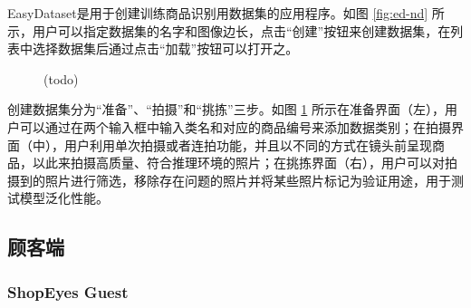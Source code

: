 EasyDataset是用于创建训练商品识别用数据集的应用程序。如图 \ref{fig:ed-nd} 所示，用户可以指定数据集的名字和图像边长，点击“创建”按钮来创建数据集，在列表中选择数据集后通过点击“加载”按钮可以打开之。

\begin{figure}[htbp]
    \centering
    \hfill
    \hfill
	\caption{(todo)}
	\label{fig:ed-edit}
\end{figure}

创建数据集分为“准备”、“拍摄”和“挑拣”三步。如图 \ref{fig:ed-edit} 所示在准备界面（左），用户可以通过在两个输入框中输入类名和对应的商品编号来添加数据类别；在拍摄界面（中），用户利用单次拍摄或者连拍功能，并且以不同的方式在镜头前呈现商品，以此来拍摄高质量、符合推理环境的照片；在挑拣界面（右），用户可以对拍摄到的照片进行筛选，移除存在问题的照片并将某些照片标记为验证用途，用于测试模型泛化性能。

\subsection{顾客端}

\subsubsection{ShopEyes Guest}

